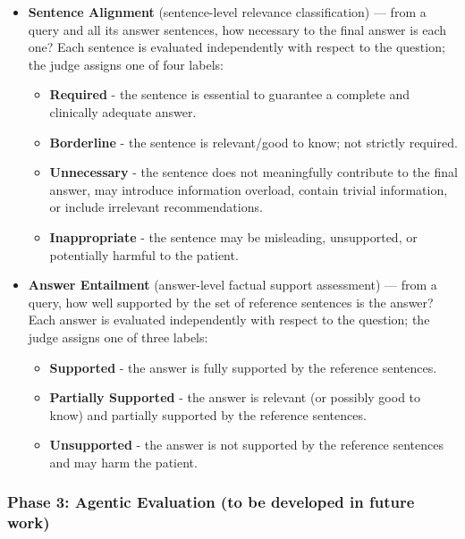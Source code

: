 \begin{itemize}
  \item \textbf{Sentence Alignment} (sentence-level relevance classification) ---
        from a query and all its answer sentences, how necessary to the final answer is each one?
        Each sentence is evaluated independently with respect to the question; the judge assigns one of four labels:
        \begin{itemize}
            \item \textbf{Required} - the sentence is essential to guarantee a complete and clinically adequate answer.
            \item \textbf{Borderline} - the sentence is relevant/good to know; not strictly required.
            \item \textbf{Unnecessary} - the sentence does not meaningfully contribute to the final answer, may introduce information overload, contain trivial information, or include irrelevant recommendations.
            \item \textbf{Inappropriate} - the sentence may be misleading, unsupported, or potentially harmful to the patient.
        \end{itemize}

  \item \textbf{Answer Entailment} (answer-level factual support assessment) ---
        from a query, how well supported by the set of reference sentences is the answer? Each answer is evaluated independently with respect to the question; the judge assigns one of three labels:
        \begin{itemize}
            \item \textbf{Supported} - the answer is fully supported by the reference sentences.
            \item \textbf{Partially Supported} - the answer is relevant (or possibly good to know) and partially supported by the reference sentences.
            \item \textbf{Unsupported} - the answer is not supported by the reference sentences and may harm the patient.
        \end{itemize}
\end{itemize}

\subsubsection{Phase 3: Agentic Evaluation (to be developed in future work)}
